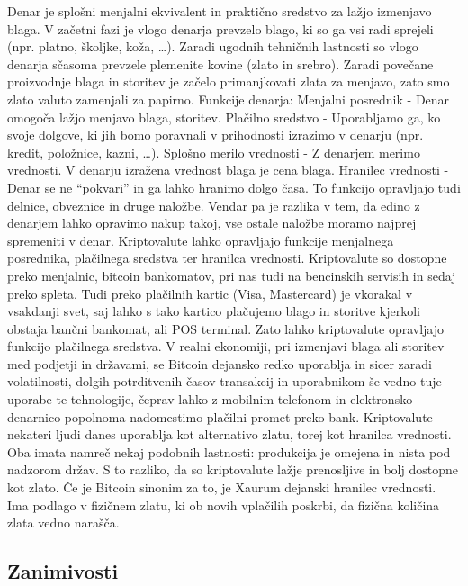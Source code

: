 \documentclass[letterpaper, titlepage, freqn]{article}
\begin{document}
Denar je splošni menjalni ekvivalent in praktično sredstvo za lažjo izmenjavo blaga. V začetni fazi je vlogo denarja prevzelo blago, ki so ga vsi radi sprejeli (npr. platno, školjke, koža, …). Zaradi ugodnih tehničnih lastnosti so vlogo denarja sčasoma prevzele plemenite kovine (zlato in srebro). Zaradi povečane proizvodnje blaga in storitev je začelo primanjkovati zlata za menjavo, zato smo zlato valuto zamenjali za papirno.
Funkcije denarja:
Menjalni posrednik - Denar omogoča lažjo menjavo blaga, storitev.
Plačilno sredstvo - Uporabljamo ga, ko svoje dolgove, ki jih bomo poravnali v prihodnosti izrazimo v denarju (npr. kredit, položnice, kazni, …).
Splošno merilo vrednosti - Z denarjem merimo vrednosti. V denarju izražena vrednost blaga je cena blaga.
Hranilec vrednosti - Denar se ne “pokvari” in ga lahko hranimo dolgo časa. To funkcijo opravljajo tudi delnice, obveznice in druge naložbe. Vendar pa je razlika v tem, da edino z denarjem lahko opravimo nakup takoj, vse ostale naložbe moramo najprej spremeniti v denar.
Kriptovalute lahko opravljajo funkcije menjalnega posrednika, plačilnega sredstva ter hranilca vrednosti. Kriptovalute so dostopne preko menjalnic, bitcoin bankomatov, pri nas tudi na bencinskih servisih in sedaj preko spleta. Tudi preko plačilnih kartic (Visa, Mastercard) je vkorakal v vsakdanji svet, saj lahko s tako kartico plačujemo blago in storitve kjerkoli obstaja bančni bankomat, ali POS terminal. Zato lahko kriptovalute opravljajo funkcijo plačilnega sredstva. V realni ekonomiji, pri izmenjavi blaga ali storitev med podjetji in državami, se Bitcoin dejansko redko uporablja in sicer zaradi volatilnosti, dolgih potrditvenih časov transakcij in uporabnikom še vedno tuje uporabe te tehnologije, čeprav lahko z mobilnim telefonom in elektronsko denarnico popolnoma nadomestimo plačilni promet preko bank.
Kriptovalute nekateri ljudi danes uporablja kot alternativo zlatu, torej kot hranilca vrednosti. Oba imata namreč nekaj podobnih lastnosti: produkcija je omejena in nista pod nadzorom držav. S to razliko, da so kriptovalute lažje prenosljive in bolj dostopne kot zlato. Če je Bitcoin sinonim za to, je Xaurum dejanski hranilec vrednosti. Ima podlago v fizičnem zlatu, ki ob novih vplačilih poskrbi, da fizična količina zlata vedno narašča.\\

\subsection{Zanimivosti}
\end{document}
